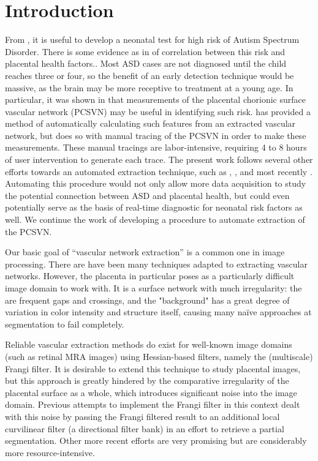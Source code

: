 \chapter{Introduction} \label{ch:introduction}

From \cite{chang2017}, it is useful to develop a neonatal test for high risk of
Autism Spectrum Disorder. There is some evidence as in \cite{chang2016whole}
of correlation between this risk and placental health factors.. Most ASD
cases are not diagnosed until the child reaches three or four, so the benefit
of an early detection technique would be massive, as the brain may be more
receptive to treatment at a young age. In particular, it was shown in
\cite{chang2016whole} that measurements of the placental chorionic surface
vascular network (PCSVN) may be useful in identifying such risk.
\cite{chang2017} has provided a method of automatically calculating such
features from an extracted vascular network, but does so with manual tracing of
the PCSVN in order to make these measurements.  These manual tracings are
labor-intensive, requiring 4 to 8 hours of user intervention to generate each trace.
The present work follows several other efforts towards an automated extraction
technique, such as \cite{almoussa-ucla-reu}, \cite{huynh2013filter}, and
most recently \cite{djima2017enhancing}. Automating this procedure would not
only allow more data acquisition to study the potential connection between ASD
and placental health, but could even potentially serve as the basis of real-time
diagnostic for neonatal risk factors as well. We continue the work of
developing a procedure to automate extraction of the PCSVN.


Our basic goal of ``vascular network extraction'' is a common one in image
processing. There are have been many techniques adapted to extracting vascular
networks. However, the placenta in particular poses as a particularly difficult
image domain to work with. It is a surface network with much irregularity: the are
frequent gaps and crossings, and the "background" has a great degree of variation in
color intensity and structure itself, causing many na\"{i}ve
approaches at segmentation to fail completely.

Reliable vascular extraction methods do exist for well-known image domains
(such as retinal MRA images) using Hessian-based filters, namely the (multiscale) Frangi filter.
It is desirable to extend this technique to study placental images, but this
approach is greatly hindered by the comparative irregularity of the placental
surface as a whole, which introduces significant noise into the image domain.
Previous attempts to implement the Frangi filter in this context \cite{huynh2013filter}
dealt with this noise by passing the Frangi filtered result to an additional local
curvilinear filter (a directional filter bank) in an effort to retrieve a partial
segmentation. Other more recent efforts \cite{djima2017enhancing} are very promising
but are considerably more resource-intensive.

